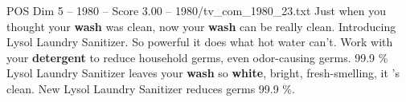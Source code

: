 \begin{textsample}{POS Dim 5 – 1980 – Score 3.00 – 1980/tv\_com\_1980\_23.txt}  \label{ex:f5_pos_002}
Just when you thought your \textbf{wash} was clean, now your \textbf{wash} can be really clean.
Introducing Lysol Laundry Sanitizer.
So powerful it does what hot water can't.
Work with your \textbf{detergent} to reduce household germs, even odor-causing germs. 99.9 \% Lysol Laundry Sanitizer leaves your \textbf{wash} so \textbf{white}, bright, fresh-smelling, it 's clean.
New Lysol Laundry Sanitizer reduces germs 99.9 \%.

\end{textsample}
